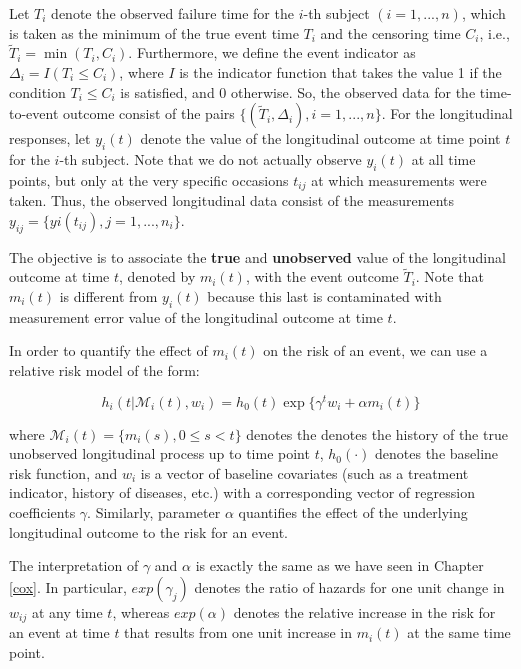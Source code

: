 \documentclass[]{book}
\theoremstyle{definition}
\theoremstyle{definition}
\theoremstyle{definition}
\theoremstyle{remark}
\let\BeginKnitrBlock\begin \let\EndKnitrBlock\end
\begin{document}
Let \(T_i\) denote the observed failure time for the \(i\)-th subject
\((i = 1,...,n)\), which is taken as the minimum of the true event time
\(T_i\) and the censoring time \(C_i\), i.e.,
\(\widetilde T_i = \min(T_i,C_i)\). Furthermore, we define the event
indicator as \(\Delta_i = I(T_i \le C_i)\), where \(I\) is the indicator
function that takes the value 1 if the condition \(T_i \le C_i\) is
satisfied, and 0 otherwise. So, the observed data for the time-to-event
outcome consist of the pairs
\(\{(\widetilde T_i, \Delta_i), i = 1, . . . , n\}\). For the
longitudinal responses, let \(y_i(t)\) denote the value of the
longitudinal outcome at time point \(t\) for the \(i\)-th subject. Note
that we do not actually observe \(y_i(t)\) at all time points, but only
at the very specific occasions \(t_{ij}\) at which measurements were
taken. Thus, the observed longitudinal data consist of the measurements
\(y_{ij} = \{yi(t_{ij}),j = 1,...,n_i\}\).

The objective is to associate the \textbf{true} and \textbf{unobserved}
value of the longitudinal outcome at time \(t\), denoted by \(m_i(t)\),
with the event outcome \(\widetilde T_i\). Note that \(m_i(t)\) is
different from \(y_i(t)\) because this last is contaminated with
measurement error value of the longitudinal outcome at time \(t\).

In order to quantify the effect of \(m_i(t)\) on the risk of an event,
we can use a relative risk model of the form:

\begin{equation}
h_i(t|\mathcal{M}_i(t),w_i) = h_0(t) \exp \{ \gamma^t w_i + \alpha m_i(t) \}
\label{eq:joint}
\end{equation}

where \(\mathcal{M}_i(t)=\{ m_i(s), 0 \le s < t\}\) denotes the denotes
the history of the true unobserved longitudinal process up to time point
\(t\), \(h_0(\cdot)\) denotes the baseline risk function, and \(w_i\) is
a vector of baseline covariates (such as a treatment indicator, history
of diseases, etc.) with a corresponding vector of regression
coefficients \(\gamma\). Similarly, parameter \(\alpha\) quantifies the
effect of the underlying longitudinal outcome to the risk for an event.

\BeginKnitrBlock{rmdhint_sestelo}
The interpretation of \(\gamma\) and \(\alpha\) is exactly the same as
we have seen in Chapter \ref{cox}. In particular, \(exp(\gamma_j)\)
denotes the ratio of hazards for one unit change in \(w_{ij}\) at any
time \(t\), whereas \(exp(\alpha)\) denotes the relative increase in the
risk for an event at time \(t\) that results from one unit increase in
\(m_i(t)\) at the same time point.
\EndKnitrBlock{rmdhint_sestelo}
\end{document}
